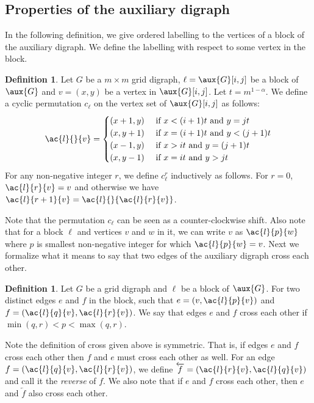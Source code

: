 \documentclass[11pt]{article}
\numberwithin{equation}{section}
\theoremstyle{definition}
\newtheorem{definition}[theorem]{Definition}
\theoremstyle{plain}
\begin{document}
%

%
\subsection{Properties of the auxiliary digraph} %
In the following definition, we give ordered labelling to the vertices of a block of the auxiliary 
digraph. %
We define the labelling with respect to some vertex 
%
in the block.
\begin{definition}
\label{def:perm}
Let $G$ be a $m \times m$ grid 
digraph, %
$\ell = \aux{G}[i,j]$ be a block of $\aux{G}$ and $v = (x, y)$ be a vertex in $\aux{G}[i,j]$. Let $t = m^{1-\alpha}$. We define a cyclic permutation $c_{\ell}$ on the vertex set of $\aux{G}[i,j]$ as follows:
\[ \ac{l}{}{v} = \begin{cases} (x +1 , y) &\text{ if } x < (i + 1)t \textup{ and } y = jt\\
(x, y +1)&\text{ if } x = (i + 1)t \textup{ and } y < (j + 1)t\\
(x-1, y) &\text{ if } x > it \textup{ and } y = (j + 1)t \\
(x, y -1)&\text{ if } x = it \textup{ and } y > jt \end{cases}\]
For any non-negative integer $r$, we define $c_{\ell}^r$ inductively as follows. For $r = 0$, $\ac{l}{r}{v} = v$ and otherwise we have $\ac{l}{r+1}{v} = \ac{l}{}{\ac{l}{r}{v}}$.
\end{definition}

 Note that the permutation $c_{\ell}$ can be seen as a counter-clockwise shift. Also note that for a block $\ell$ and vertices $v$ and $w$ in it, we can write $v$ as $\ac{l}{p}{w}$ where $p$ is smallest non-negative integer for which $\ac{l}{p}{w} = v$. Next we formalize what it means to say that two edges of the auxiliary %
digraph %
cross each other.

\begin{definition}
\label{def:cross}
Let $G$ be a grid 
digraph %
and $\ell$ be a block of $\aux{G}$. For two distinct edges $e$ and $f$ in the block, such that $e = (v, \ac{l}{p}{v})$ and $f = (\ac{l}{q}{v}, \ac{l}{r}{v})$. We say that edges $e$ and $f$ cross each other if $\min(q, r) < p < \max(q, r)$.
\end{definition}

Note the definition of cross given above is symmetric. That is, if edges $e$ and $f$ cross each other then $f$ and $e$ must cross each other as well. For an edge $f = (\ac{l}{q}{v}, \ac{l}{r}{v})$, we define $\overleftarrow{f} = (\ac{l}{r}{v}, \ac{l}{q}{v})$ and call it the \emph{reverse} of $f$. We also note that if $e$ and $f$ cross each other, then $e$ and $\overleftarrow{f}$ also cross each other.
\end{document}
